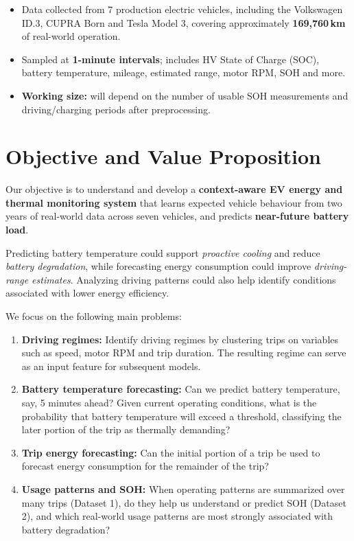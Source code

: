 \documentclass[11pt,letterpaper]{article}
\begin{document}
\begin{itemize}
  \item Data collected from 7 production electric vehicles, including the Volkswagen ID.3, CUPRA Born and Tesla Model 3, covering approximately \textbf{169,760\,km} of real-world operation.
  \item Sampled at \textbf{1-minute intervals}; includes HV State of Charge (SOC), battery temperature, mileage, estimated range, motor RPM, SOH and more.
  \item \textbf{Working size:} will depend on the number of usable SOH measurements and driving/charging periods after preprocessing.
\end{itemize}

\section{Objective and Value Proposition}

Our objective is to understand and develop a \textbf{context-aware EV energy and thermal monitoring system} that learns expected vehicle behaviour from two years of real-world data across seven vehicles, and predicts \textbf{near-future battery load}.

Predicting battery temperature could support \textit{proactive cooling} and reduce \textit{battery degradation}, while forecasting energy consumption could improve \textit{driving-range estimates}. Analyzing driving patterns could also help identify conditions associated with lower energy efficiency.

We focus on the following main problems:
\begin{enumerate}
  \item \textbf{Driving regimes:} Identify driving regimes by clustering trips on variables such as speed, motor RPM and trip duration. The resulting regime can serve as an input feature for subsequent models.
  \item \textbf{Battery temperature forecasting:} Can we predict battery temperature, say, 5 minutes ahead? Given current operating conditions, what is the probability that battery temperature will exceed a threshold, classifying the later portion of the trip as thermally demanding?
  \item \textbf{Trip energy forecasting:} Can the initial portion of a trip be used to forecast energy consumption for the remainder of the trip?
  \item \textbf{Usage patterns and SOH:} When operating patterns are summarized over many trips (Dataset 1), do they help us understand or predict SOH (Dataset 2), and which real-world usage patterns are most strongly associated with battery degradation?
\end{enumerate}
\end{document}
